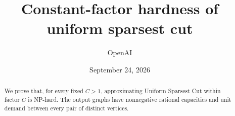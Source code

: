 \documentclass[10pt]{article}
\title{Constant-factor hardness of uniform sparsest cut}
\author{OpenAI}
\date{September 24, 2026}
\theoremstyle{definition}
\theoremstyle{remark}
\begin{document}
\maketitle
\begin{abstract}
We prove that, for every fixed $C>1$, approximating Uniform Sparsest Cut within factor $C$ is NP-hard. The output graphs have nonnegative rational capacities and unit demand between every pair of distinct vertices.
\end{abstract}
\tableofcontents










\end{document}
